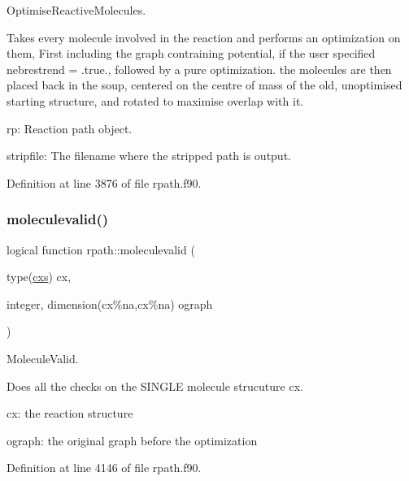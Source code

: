 Optimise\+Reactive\+Molecules. 

Takes every molecule involved in the reaction and performs an optimization on them, First including the graph contraining potential, if the user specified nebrestrend = .true., followed by a pure optimization. the molecules are then placed back in the soup, centered on the centre of mass of the old, unoptimised starting structure, and rotated to maximise overlap with it.


\begin{DoxyItemize}
\item rp\+: Reaction path object.
\item stripfile\+: The filename where the stripped path is output. 
\end{DoxyItemize}

Definition at line 3876 of file rpath.\+f90.

\mbox{\label{namespacerpath_aafdcf74818568a7573511f5205a558e0}} 
\subsubsection{\texorpdfstring{moleculevalid()}{moleculevalid()}}
{\footnotesize\ttfamily logical function rpath\+::moleculevalid (\begin{DoxyParamCaption}\item[{type(\mbox{\hyperlink{structchemstr_1_1cxs}{cxs}})}]{cx,  }\item[{integer, dimension(cx\%na,cx\%na)}]{ograph }\end{DoxyParamCaption})}



Molecule\+Valid. 

Does all the checks on the S\+I\+N\+G\+LE molecule strucuture cx.


\begin{DoxyItemize}
\item cx\+: the reaction structure
\item ograph\+: the original graph before the optimization 
\end{DoxyItemize}

Definition at line 4146 of file rpath.\+f90.

\mbox{\label{namespacerpath_a1af24f3421dc3b87b062668f04eaee22}} 
